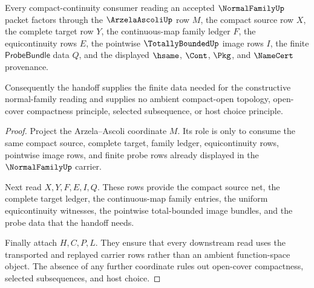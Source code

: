 \begin{theorem}
\label{thm:normal-family-arzela-ascoli-handoff}
Every compact-continuity consumer reading an accepted $\NormalFamilyUp$ packet factors through the $\ArzelaAscoliUp$ row $M$, the compact source row $X$, the complete target row $Y$, the continuous-map family ledger $F$, the equicontinuity rows $E$, the pointwise $\TotallyBoundedUp$ image rows $I$, the finite $\mathsf{ProbeBundle}$ data $Q$, and the displayed $\hsame$, $\Cont$, $\Pkg$, and $\NameCert$ provenance.

Consequently the handoff supplies the finite data needed for the constructive normal-family reading and supplies no ambient compact-open topology, open-cover compactness principle, selected subsequence, or host choice principle.
\end{theorem}
\begin{proof}
Project the Arzela--Ascoli coordinate $M$. Its role is only to consume the same compact source, complete target, family ledger, equicontinuity rows, pointwise image rows, and finite probe rows already displayed in the $\NormalFamilyUp$ carrier.

Next read $X,Y,F,E,I,Q$. These rows provide the compact source net, the complete target ledger, the continuous-map family entries, the uniform equicontinuity witnesses, the pointwise total-bounded image bundles, and the probe data that the handoff needs.

Finally attach $H,C,P,L$. They ensure that every downstream read uses the transported and replayed carrier rows rather than an ambient function-space object. The absence of any further coordinate rules out open-cover compactness, selected subsequences, and host choice.
\end{proof}


\begin{closurestatus}{\NormalFamilyUp}
  \theoryclosure{\seedClosure}
  \formalstatus{\unformalizedV}
\end{closurestatus}
